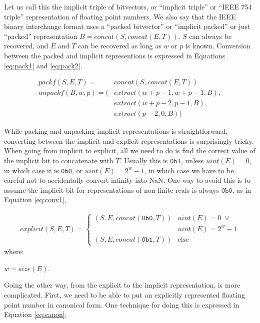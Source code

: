 \documentclass[letterpaper,10pt]{article}
\begin{document}
Let us call this the implicit triple of bitvectors, or ``implicit triple'' or ``IEEE 754 triple'' representation of floating point numbers. We also say that the IEEE binary interchange format uses a ``packed bitvector'' or ``implicit packed'' or just ``packed'' representation $B = concat(S, concat(E, T))$. $S$ can always be recovered, and $E$ and $T$ can be recovered as long as $w$ or $p$ is known. Conversion between the packed and implicit representions is expressed in Equations \ref{eq:pack1} and \ref{eq:pack2}.

\begin{align}
 packf(S, E, T)   = \;\;\, &concat(S, concat(E, T)) \label{eq:pack1} \\
 unpackf(B, w, p) = (&extract(w + p - 1, w + p - 1, B), \label{eq:pack2} \\
                     &extract(w + p - 2, p - 1, B), \nonumber \\
                     &extract(p - 2, 0, B)) \nonumber
\end{align}

While packing and unpacking implicit representations is straightforward, converting between the implicit and explicit representations is surprisingly tricky. When going from implicit to explicit, all we need to do is find the correct value of the implicit bit to concatenate with $T$. Usually this is $\texttt{0b1}$, unless $uint(E) = 0$, in which case it is $\texttt{0b0}$, or $uint(E) = 2^w - 1$, in which case we have to be careful not to accidentally convert infinity into NaN. One way to avoid this is to assume the implicit bit for representations of non-finite reals is always $\texttt{0b0}$, as in Equation \ref{eq:conv1},

\begin{align} \label{eq:conv1}
 explicit(S, E, T) =
 \begin{cases}
  (S, E, concat(\texttt{0b0}, T)) & uint(E) = 0 \; \lor \\
                                  & uint(E) = 2^w - 1   \\
  (S, E, concat(\texttt{0b1}, T)) & \text{else}
 \end{cases}
\end{align}
where:
\begin{description}
 \item $w = size(E)$.
\end{description}

Going the other way, from the explicit to the implicit representation, is more complicated. First, we need to be able to put an explicitly represented floating point number in canonical form. One technique for doing this is expressed in Equation \ref{eq:canon},
\end{document}
